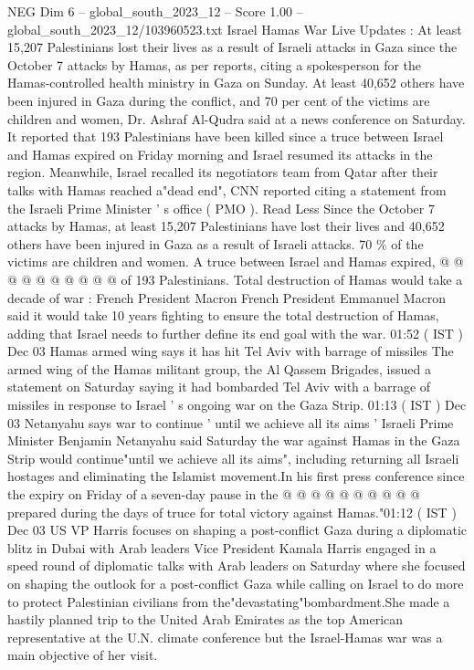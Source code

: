 \begin{textsample}{NEG Dim 6 – global\_south\_2023\_12 – Score 1.00 – global\_south\_2023\_12/103960523.txt}  \label{ex:f6_neg_325}
Israel Hamas War Live Updates : At least 15,207 Palestinians lost their lives as a result of Israeli attacks in Gaza since the October 7 attacks by Hamas, as per reports, citing a spokesperson for the Hamas-controlled health ministry in Gaza on Sunday.
At least 40,652 others have been injured in Gaza during the conflict, and 70 per cent of the victims are children and women, Dr.
Ashraf Al-Qudra said at a news conference on Saturday.
It reported that 193 Palestinians have been killed since a truce between Israel and Hamas expired on Friday morning and Israel resumed its attacks in the region.
Meanwhile, Israel recalled its negotiators team from Qatar after their talks with Hamas reached a"dead end", CNN reported citing a statement from the Israeli Prime Minister ' s office ( PMO ).
Read Less Since the October 7 attacks by Hamas, at least 15,207 Palestinians have lost their lives and 40,652 others have been injured in Gaza as a result of Israeli attacks. 70 \% of the victims are children and women.
A truce between Israel and Hamas expired, @ @ @ @ @ @ @ @ @ @ of 193 Palestinians.
Total destruction of Hamas would take a decade of war : French President Macron French President Emmanuel Macron said it would take 10 years fighting to ensure the total destruction of Hamas, adding that Israel needs to further define its end goal with the war. 01:52 ( IST ) Dec 03 Hamas armed wing says it has hit Tel Aviv with barrage of missiles The armed wing of the Hamas militant group, the Al Qassem Brigades, issued a statement on Saturday saying it had bombarded Tel Aviv with a barrage of missiles in response to Israel ' s ongoing war on the Gaza Strip. 01:13 ( IST ) Dec 03 Netanyahu says war to continue ' until we achieve all its aims ' Israeli Prime Minister Benjamin Netanyahu said Saturday the war against Hamas in the Gaza Strip would continue"until we achieve all its aims", including returning all Israeli hostages and eliminating the Islamist movement.In his first press conference since the expiry on Friday of a seven-day pause in the @ @ @ @ @ @ @ @ @ @ prepared during the days of truce for total victory against Hamas."01:12 ( IST ) Dec 03 US VP Harris focuses on shaping a post-conflict Gaza during a diplomatic blitz in Dubai with Arab leaders Vice President Kamala Harris engaged in a speed round of diplomatic talks with Arab leaders on Saturday where she focused on shaping the outlook for a post-conflict Gaza while calling on Israel to do more to protect Palestinian civilians from the"devastating"bombardment.She made a hastily planned trip to the United Arab Emirates as the top American representative at the U.N. climate conference but the Israel-Hamas war was a main objective of her visit.

\end{textsample}
